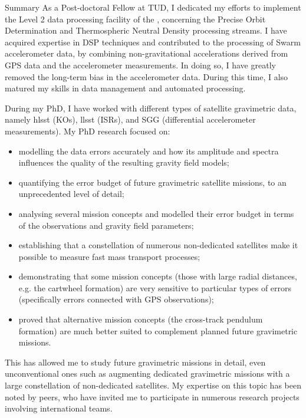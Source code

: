 \begin{cvtext}{Summary}
As a Post-doctoral Fellow at \ac{TUD}, I dedicated my efforts to implement the Level 2 data processing facility of the , concerning the Precise Orbit Determination and Thermospheric Neutral Density processing streams.
I have acquired expertise in \ac{DSP} techniques and contributed to the processing of Swarm accelerometer data, by combining non-gravitational accelerations derived from \ac{GPS} data and the accelerometer measurements.
In doing so, I have greatly removed the long-term bias in the accelerometer data.
During this time, I also matured my skills in data management and automated processing.

During my PhD, I have worked with different types of satellite gravimetric data, namely \acl{hlsst} (\aclp{KO}), \acl{llsst} (\aclp{ISR}), and \acl{SGG} (differential accelerometer measurements).
My PhD research focused on:
\begin{itemize}[topsep=0pt,itemsep=1pt,parsep=0pt,partopsep=0pt]
\item modelling the data errors accurately and how its amplitude and spectra influences the quality of the resulting gravity field models;
\item quantifying the error budget of future gravimetric satellite missions, to an unprecedented level of detail;
\item analysing several mission concepts and modelled their error budget in terms of the observations and gravity field parameters;
\item establishing that a constellation of numerous non-dedicated satellites make it possible to measure fast mass transport processes;
\item demonstrating that some mission concepts (those with large radial distances, \acs{e.g.} the cartwheel formation) are very sensitive to particular types of errors (specifically errors connected with \ac{GPS} observations); %
\item proved that alternative mission concepts (the cross-track pendulum formation) are much better suited to complement planned future gravimetric missions.%
\end{itemize}
This has allowed me to study future gravimetric missions in detail, even unconventional ones such as augmenting dedicated gravimetric missions with a large constellation of non-dedicated satellites.
My expertise on this topic has been noted by peers, who have invited me to participate in numerous research projects involving international teams.


\end{cvtext}
